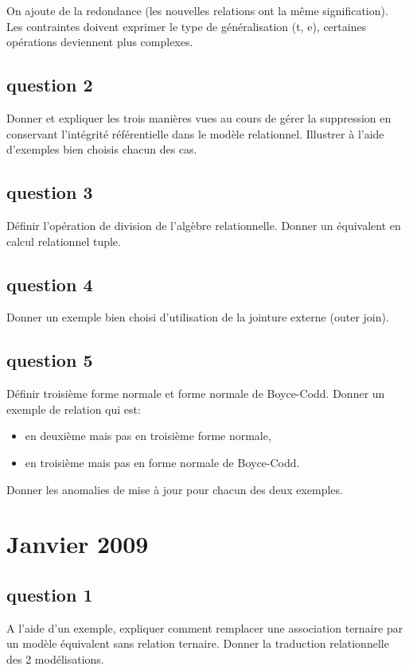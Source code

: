 On ajoute de la redondance (les nouvelles relations ont la m\^eme signification).
Les contraintes doivent exprimer le type de généralisation (t, e), 
certaines opérations deviennent plus complexes.


\subsection{question 2}
	Donner et expliquer les trois manières vues au cours de gérer la suppression en conservant l'intégrité référentielle dans le modèle relationnel. Illustrer à l'aide d'exemples bien choisis chacun des cas.

\subsection{question 3}
	Définir l'opération de division de l'algèbre relationnelle. Donner un équivalent en calcul relationnel tuple.
\subsection{question 4}
Donner un exemple bien choisi d’utilisation de la jointure externe (outer join).

\subsection{question 5}
Définir troisième forme normale et forme normale de Boyce-Codd.
Donner un exemple de relation qui est:
\begin{itemize}
	\item en deuxième mais pas en troisième forme normale,
	\item en troisième mais pas en forme normale de Boyce-Codd.
\end{itemize}
Donner les anomalies de mise à jour pour chacun des deux exemples.


\section{Janvier 2009}

\subsection{question 1}
A l’aide d’un exemple, expliquer comment remplacer une association ternaire par un modèle
équivalent sans relation ternaire. Donner la traduction relationnelle des 2 modélisations.

